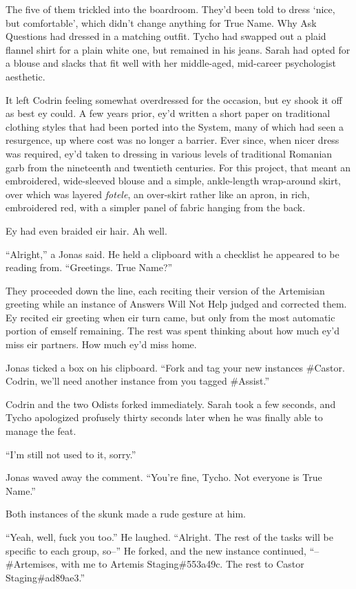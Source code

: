 The five of them trickled into the boardroom. They'd been told to dress `nice, but comfortable', which didn't change anything for True Name. Why Ask Questions had dressed in a matching outfit. Tycho had swapped out a plaid flannel shirt for a plain white one, but remained in his jeans. Sarah had opted for a blouse and slacks that fit well with her middle-aged, mid-career psychologist aesthetic.

It left Codrin feeling somewhat overdressed for the occasion, but ey shook it off as best ey could. A few years prior, ey'd written a short paper on traditional clothing styles that had been ported into the System, many of which had seen a resurgence, up where cost was no longer a barrier. Ever since, when nicer dress was required, ey'd taken to dressing in various levels of traditional Romanian garb from the nineteenth and twentieth centuries. For this project, that meant an embroidered, wide-sleeved blouse and a simple, ankle-length wrap-around skirt, over which was layered \emph{fotele}, an over-skirt rather like an apron, in rich, embroidered red, with a simpler panel of fabric hanging from the back.

Ey had even braided eir hair. Ah well.

``Alright,'' a Jonas said. He held a clipboard with a checklist he appeared to be reading from. ``Greetings. True Name?''

They proceeded down the line, each reciting their version of the Artemisian greeting while an instance of Answers Will Not Help judged and corrected them. Ey recited eir greeting when eir turn came, but only from the most automatic portion of emself remaining. The rest was spent thinking about how much ey'd miss eir partners. How much ey'd miss home.

Jonas ticked a box on his clipboard. ``Fork and tag your new instances \#Castor. Codrin, we'll need another instance from you tagged \#Assist.''

Codrin and the two Odists forked immediately. Sarah took a few seconds, and Tycho apologized profusely thirty seconds later when he was finally able to manage the feat.

``I'm still not used to it, sorry.''

Jonas waved away the comment. ``You're fine, Tycho. Not everyone is True Name.''

Both instances of the skunk made a rude gesture at him.

``Yeah, well, fuck you too.'' He laughed. ``Alright. The rest of the tasks will be specific to each group, so--'' He forked, and the new instance continued, ``--\#Artemises, with me to Artemis Staging\#553a49c. The rest to Castor Staging\#ad89ae3.''


